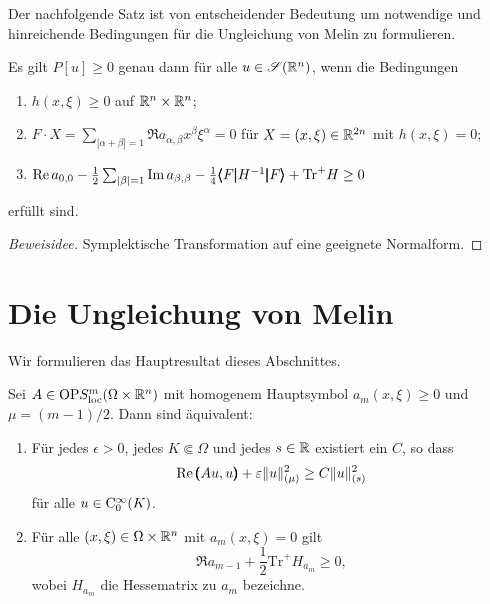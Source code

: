 Der nachfolgende Satz ist von entscheidender Bedeutung um notwendige und hinreichende Bedingungen für die Ungleichung von Melin zu formulieren.

\begin{thm}\label{satz:thm2.4}
Es gilt $P[u]\ge0$ genau dann für alle $u\in\mathscr S(\mathbb R^n)$, wenn die Bedingungen
\begin{enumerate}
\item  $h(x,\xi)\ge0$ auf $\mathbb R^n\times\mathbb R^n$;
\item $F \cdot X = \sum_{|\alpha+\beta|=1} \Re a_{\alpha,\beta} x^\beta\xi^\alpha = 0$ für $X=(x,\xi)\in\mathbb R^{2n}$ mit $h(x,\xi)=0$;
\item $\operatorname{Re} a_{0,0} - \frac12 \sum_{|\beta|=1} \operatorname{Im} a_{\beta,\beta} -\frac14  \pmb\langle F\pmb|H^{-1}\pmb|F\pmb\rangle + {\mathrm{Tr}}^+ H \ge 0$
\end{enumerate}
erfüllt sind.
\end{thm}
\begin{proof}[Beweisidee]
Symplektische Transformation auf eine geeignete Normalform. 
\end{proof}


\section{Die Ungleichung von Melin}
Wir formulieren das Hauptresultat dieses Abschnittes.

\begin{thm}
Sei $A\in\mathrm{OP}S^{m}_{\rm loc}(\Omega\times\mathbb R^n)$ mit homogenem Hauptsymbol $a_m(x,\xi)\ge0$ und $\mu=(m-1)/2$. Dann sind \"aquivalent:
\begin{enumerate}
\item F\"ur jedes $\epsilon>0$, jedes $K\Subset\Omega$ und jedes $s\in\mathbb R$ existiert ein $C$, so dass
\begin{equation}
    \operatorname{Re} \pmb(Au,u\pmb) + \varepsilon \|u\|^2_{(\mu)}  \ge C\|u\|_{(s)}^2\label{ungleichungvonmelin}
\end{equation}
für alle $u\in\mathrm C_0^\infty(K)$.
\item
Für alle $(x,\xi)\in\Omega\times\mathbb R^n$ mit $a_m(x,\xi)=0$ gilt
\begin{equation}\label{bedfuerungleichung}
   \Re a_{m-1} +  \frac 1 2 {\mathrm{Tr}}^+ H_{a_m} \ge 0,
\end{equation}
wobei $H_{a_m}$ die Hessematrix zu $a_m$ bezeichne.
\end{enumerate}
\end{thm}

